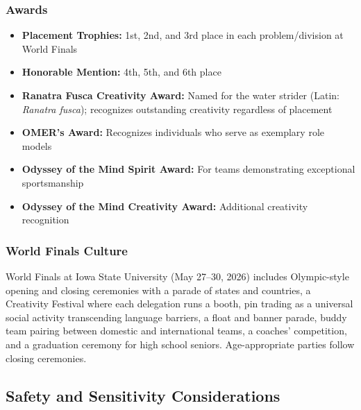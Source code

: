 \documentclass[11pt,letterpaper]{article}
\begin{document}
\subsubsection{Awards}

\begin{itemize}[leftmargin=2em]
\item \textbf{Placement Trophies:} 1st, 2nd, and 3rd place in each problem/division at World Finals
\item \textbf{Honorable Mention:} 4th, 5th, and 6th place
\item \textbf{Ranatra Fusca Creativity Award:} Named for the water strider (Latin: \emph{Ranatra fusca}); recognizes outstanding creativity regardless of placement
\item \textbf{OMER's Award:} Recognizes individuals who serve as exemplary role models
\item \textbf{Odyssey of the Mind Spirit Award:} For teams demonstrating exceptional sportsmanship
\item \textbf{Odyssey of the Mind Creativity Award:} Additional creativity recognition
\end{itemize}

\subsubsection{World Finals Culture}

World Finals at Iowa State University (May 27--30, 2026) includes Olympic-style opening and closing ceremonies with a parade of states and countries, a Creativity Festival where each delegation runs a booth, pin trading as a universal social activity transcending language barriers, a float and banner parade, buddy team pairing between domestic and international teams, a coaches' competition, and a graduation ceremony for high school seniors. Age-appropriate parties follow closing ceremonies.

\subsection{Safety and Sensitivity Considerations}
\end{document}
